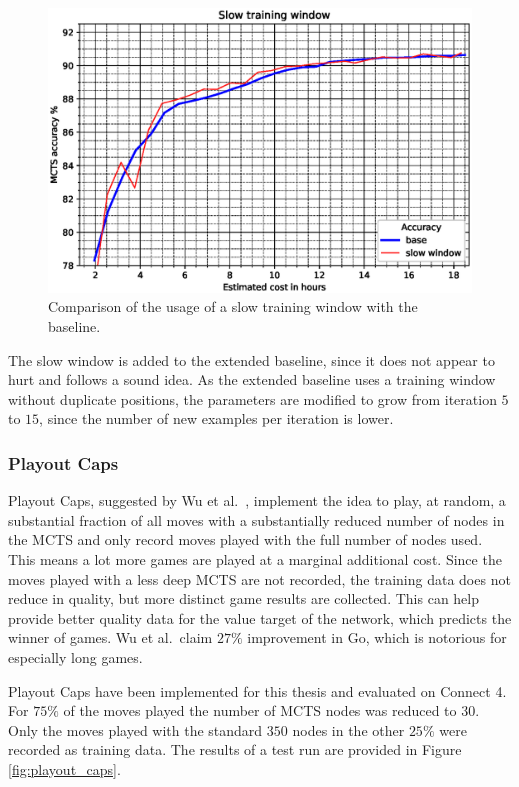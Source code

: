 \documentclass[12pt,onecolumn,oneside,titlepage]{article}
\begin{document}
\begin{figure}[H]
\centering
\includegraphics[clip,width=\columnwidth]{slow_window}
\caption{Comparison of the usage of a slow training window with the baseline.}
\label{fig:slow_window_results}
\end{figure}

The slow window is added to the extended baseline, since it does not appear to hurt and follows a sound idea. 
As the extended baseline uses a training window without duplicate positions, the parameters are modified
to grow from iteration $5$ to $15$, since the number of new examples per iteration is lower.

\subsubsection{Playout Caps}

Playout Caps, suggested by Wu et al.\ \cite{wu2019accelerating}, implement the idea to play, at random, 
a substantial fraction of all moves with a substantially reduced number of nodes in the MCTS and only record moves played with the full number of nodes used.
This means a lot more games are played at a marginal additional cost. Since the moves played with a less deep
MCTS are not recorded, the training data does not reduce in quality, but more distinct game results are collected.
This can help provide better quality data for the value target of the network, which predicts the winner of games. Wu et al.\ claim $27\%$ improvement in Go, which is notorious for especially long games.

Playout Caps have been implemented for this thesis and evaluated on Connect 4.
For $75\%$ of the moves played the number of MCTS nodes was reduced to $30$. Only the moves played with the standard $350$ nodes in the other $25\%$ were recorded as training data.
The results of a test run are provided in Figure \ref{fig:playout_caps}.
\end{document}
